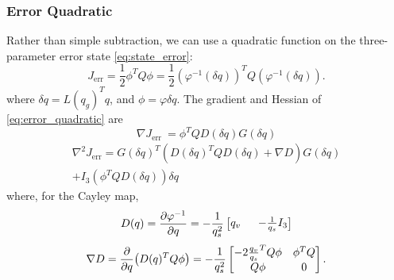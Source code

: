 \documentclass[letterpaper, 10 pt, conference]{ieeeconf}  %
\newcommand{\half}{\frac{1}{2}}
\begin{document}
        \subsubsection{Error Quadratic}
            Rather than simple subtraction, we can use a quadratic function on the
            three-parameter error state \eqref{eq:state_error}:
            \begin{equation} \label{eq:error_quadratic}
                J_\text{err} = \half \phi^T Q \phi 
                = \half \left(\varphi^{-1}(\delta q)\right)^T Q 
                        \left(\varphi^{-1}(\delta q)\right).
            \end{equation}
            where $\delta q = L(q_g)^T q$, and $\phi = \varphi{\delta q}$. The gradient
            and Hessian of \eqref{eq:error_quadratic} are
            \begin{equation}
                \nabla J_\text{err }= \phi^T Q  D(\delta q)  G(\delta q)
            \end{equation}
            \begin{multline}
                \nabla^2 J_\text{err} = 
                    G(\delta q)^T \! \left(
                    D(\delta q)^T Q D(\delta q) + \nabla D \right) G(\delta q)  \\
                    + I_3 (\phi^T Q  D(\delta q)) \delta q %
            \end{multline}
            where, for the Cayley map,
            \begin{equation}
                D(q) = \pdv{\varphi^{-1}}{q} = -\frac{1}{q_s^2}\begin{bmatrix}
                    q_v \;\; & -\frac{1}{q_s} I_3
                \end{bmatrix}
            \end{equation}
            \begin{equation}
                \nabla D = \pdv{q}(D(q)^T Q \phi) 
                = -\frac{1}{q_s^2} \begin{bmatrix} 
                    -2 \frac{q_v}{q_s}^T Q \phi & \phi^T Q \\
                                   Q \phi & 0 \\
                \end{bmatrix}.
            \end{equation}
\end{document}
